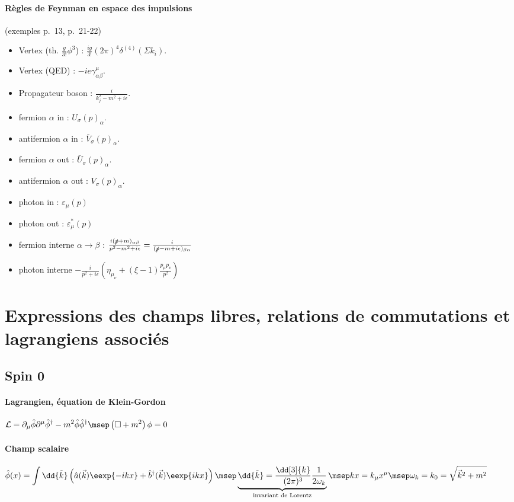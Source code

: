 \documentclass{article}
\begin{document}
\paragraph{Règles de Feynman en espace des impulsions}(exemples p.~13, p.~21-22)
\begin{itemize}
\item Vertex (th. $\frac{g}{3!}\phi^3$) : $\frac{ig}{3!} (2\pi)^4\delta^{(4)}(\Sigma k_i)$.
\item Vertex (QED) : $-ie\gamma^\mu_{\alpha\beta}$.
\item Propagateur boson : $\frac{i}{k_j^2-m^2+i\epsilon}$.
\item fermion $\alpha$ in : $U_\sigma(p)_\alpha$.
\item antifermion $\alpha$ in : $\bar{V}_\sigma(p)_\alpha$.
\item fermion $\alpha$ out : $\bar{U}_\sigma(p)_\alpha$.
\item antifermion $\alpha$ out : $V_\sigma(p)_\alpha$.
\item photon in : $\varepsilon_\mu(p)$
\item photon out : $\varepsilon^*_\mu(p)$
\item fermion interne $\alpha\rightarrow\beta$ : $\frac{i(\slashed{p}+m)_{\alpha\beta}}{p^2-m^2+i\epsilon}=\frac{i}{(\slashed{p}-m+i\epsilon)_{\beta\alpha}}$
\item photon interne $-\frac{i}{p^2+i\epsilon}\left( \eta_{\mu_\nu} + (\xi-1)\frac{p_\mu p_\nu}{p^2} \right)$
\end{itemize}

\section{Expressions des champs libres, relations de commutations et lagrangiens associés}

\subsection{Spin 0}
\paragraph{Lagrangien, équation de Klein-Gordon}$\displaystyle
\mathcal{L} = \partial_\mu\hat{\phi}\partial^\mu\hat{\phi}^\dagger - m^2 \hat{\phi}\hat{\phi}^\dagger
\msep
\left(\square + m^2\right)\phi=0
$
\paragraph{Champ scalaire}$\displaystyle
\hat{\phi}(x) = \int \dd{\tilde{k}}\left( \hat{a}(\vec{k})\eexp{-ikx}+\hat{b}^\dagger(\vec{k})\eexp{ikx} \right)
\msep
\underbrace{\dd{\tilde{k}} = \frac{\dd[3]{k}}{(2\pi)^3}\frac{1}{2\omega_k}}_\text{invariant de Lorentz}
\msep
kx = k_\mu x^\mu
\msep
\omega_k = k_0 = \sqrt{\vec{k}^2+m^2}
$
\end{document}
